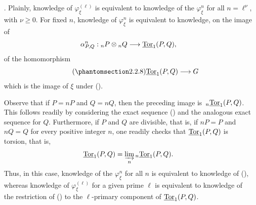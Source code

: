 . Plainly, knowledge of $\varphi^{(\ell)}_\xi$ is equivalent
to knowledge of the $\varphi^n_\xi$ for all $n=\ell^\nu$, with
$\nu\geq0$.  For fixed $n$, knowledge of $\varphi^n_\xi$ is
equivalent to knowledge, on the image of
\[
 \alpha^n_{P,Q}:{}_nP\otimes{}_nQ\longrightarrow\uTor_1(P,Q),
\]
of the homomorphism
\begin{equation}\tag{\SGARefTarget{sga7.sga7i.eviii.n2-2-8}{2.2.8}}
 \uTor_1(P,Q)\longrightarrow G
\end{equation}
which is the image of $\xi$ under ().

Observe that if $P=nP$ and $Q=nQ$, then the preceding image is
$\,{}_n\uTor_1(P,Q)$.  This follows readily by considering the exact
sequence () and the analogous exact sequence for $Q$.
Furthermore, if $P$ and $Q$ are divisible, that is, if $nP=P$ and
$nQ=Q$ for every positive integer $n$, one readily checks that
$\uTor_1(P,Q)$ is torsion, that is,
\[
 \uTor_1(P,Q)=\varinjlim_n{}_{n}\uTor_1(P,Q).
\]
Thus, in this case, knowledge of the $\varphi^n_\xi$ for all $n$ is
equivalent to knowledge of (), whereas knowledge of
$\varphi^{(\ell)}_\xi$ for a given prime $\ell$ is equivalent to
knowledge of the restriction of () to the $\ell$-primary
component of $\uTor_1(P,Q)$.

